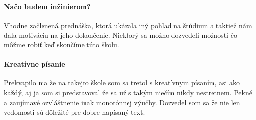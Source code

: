 \documentclass[10pt,twoside,slovak,a4paper]{article}
\begin{document}
\paragraph{Načo budem inžinierom?}
Vhodne začlenená prednáška, ktorá ukázala iný pohľad na štúdium a taktiež nám dala motiváciu na jeho dokončenie. Niektorý sa možno dozvedeli možnosti čo môžme robiť keď skončíme túto školu.
\paragraph{Kreatívne písanie}
Prekvapilo ma že na takejto škole som sa tretol s kreatívnym písaním, asi ako každý, aj ja som si predstavoval že sa už s takým niečím nikdy nestretnem. Pekné a zaujímavé ozvláštnenie inak monotónnej výučby. Dozvedel som sa že nie len vedomosti sú dôležité pre dobre napísaný text.
\end{document}
